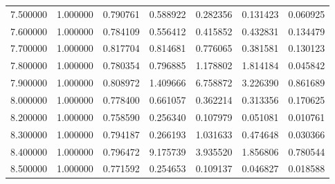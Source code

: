 \begin{table}
\begin{tabular}{rrrrrrr}
7.500000 & 1.000000 & 0.790761 & 0.588922 & 0.282356 & 0.131423 & 0.060925 \\
7.600000 & 1.000000 & 0.784109 & 0.556412 & 0.415852 & 0.432831 & 0.134479 \\
7.700000 & 1.000000 & 0.817704 & 0.814681 & 0.776065 & 0.381581 & 0.130123 \\
7.800000 & 1.000000 & 0.780354 & 0.796885 & 1.178802 & 1.814184 & 0.045842 \\
7.900000 & 1.000000 & 0.808972 & 1.409666 & 6.758872 & 3.226390 & 0.861689 \\
8.000000 & 1.000000 & 0.778400 & 0.661057 & 0.362214 & 0.313356 & 0.170625 \\
8.200000 & 1.000000 & 0.758590 & 0.256340 & 0.107979 & 0.051081 & 0.010761 \\
8.300000 & 1.000000 & 0.794187 & 0.266193 & 1.031633 & 0.474648 & 0.030366 \\
8.400000 & 1.000000 & 0.796472 & 9.175739 & 3.935520 & 1.856806 & 0.780544 \\
8.500000 & 1.000000 & 0.771592 & 0.254653 & 0.109137 & 0.046827 & 0.018588 \\
\bottomrule
\end{tabular}
\end{table}
